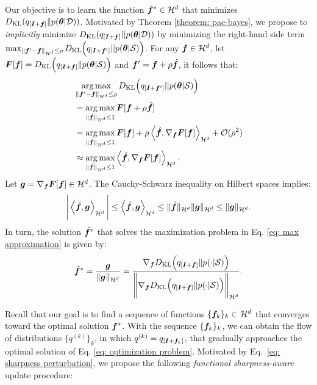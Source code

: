   Our objective is to learn the function ${\bm{f}}^* \in {\mathcal{H}}^d$ that minimizes $D_{\mathrm{KL}}(q_{[{\bm{I}} + {\bm{f}}]}\| p({\bm{\theta}}| {\mathcal{D}}))$. Motivated by Theorem \ref{theorem: pac-bayes}, we propose to \textit{implicitly} minimize $D_{\mathrm{KL}}(q_{[{\bm{I}} + {\bm{f}}]} || p({\bm{\theta}}|{\mathcal{D}}))$ by minimizing the right-hand side term $\max_{\|{\bm{f}}'-{\bm{f}}\|_{{\mathcal{H}}^d} \leq \rho}D_{\mathrm{KL}}\Big(q_{[{\bm{I}} + {\bm{f}}']} || p({\bm{\theta}} | {\mathcal{S}})\Big)$. For any ${\bm{f}} \in {\mathcal{H}}^d$, let ${\bm{F}}[{\bm{f}}] = D_{\mathrm{KL}}\Big(q_{[{\bm{I}} + {\bm{f}}]} \|p({\bm{\theta}} | {\mathcal{S}})\Big)$ and ${\bm{f}}' = {\bm{f}} + \rho \hat{{\bm{f}}}$, it follows that:
\begin{align}
    &\operatorname*{arg\,max}_{\|{\bm{f}}'-{\bm{f}}\|_{{\mathcal{H}}^d} \leq \rho}D_{\mathrm{KL}}\Big(q_{[{\bm{I}} + {\bm{f}}']} || p({\bm{\theta}} | {\mathcal{S}})\Big) \\
    &= \operatorname*{arg\,max}_{\|\hat{{\bm{f}}}\|_{{\mathcal{H}}^d} \leq 1}{\bm{F}}[{\bm{f}}+\rho \hat{{\bm{f}}}] \\
    &= \operatorname*{arg\,max}_{\|\hat{{\bm{f}}}\|_{{\mathcal{H}}^d} \leq 1}{\bm{F}}[{\bm{f}}]+\rho\left<\hat{{\bm{f}}}, \nabla_{\bm{f}} {\bm{F}}[{\bm{f}}]\right>_{{\mathcal{H}}^d} + {\mathcal{O}}(\rho^2)\\
    &\approx\operatorname*{arg\,max}_{\|\hat{{\bm{f}}}\|_{{\mathcal{H}}^d} \leq 1}\left<\hat{{\bm{f}}}, \nabla_{\bm{f}} {\bm{F}}[{\bm{f}}]\right>_{{\mathcal{H}}^d}.
    \label{eq: max approximation}
\end{align}
Let ${\bm{g}} = \nabla_{\bm{f}} {\bm{F}}[{\bm{f}}] \in {\mathcal{H}}^d$. The Cauchy-Schwarz inequality on Hilbert spaces \citep{functional_analysis} implies:
\begin{equation*}
    \Bigg| \left<\hat{{\bm{f}}}, {\bm{g}}\right>_{{\mathcal{H}}^d}\Bigg| \leq \left<\hat{{\bm{f}}}, {\bm{g}}\right>_{{\mathcal{H}}^d} \leq \|\hat{{\bm{f}}}\|_{{\mathcal{H}}^d} \|{\bm{g}}\|_{{\mathcal{H}}^d} \leq \|{\bm{g}}\|_{{\mathcal{H}}^d}. 
\end{equation*}
In turn, the solution $\hat{{\bm{f}}}^*$ that solves the maximization problem in Eq. \ref{eq: max approximation} is given by:
\begin{equation}
    \label{eq: sharpness perturbation}
    \hat{{\bm{f}}}^* = \frac{{\bm{g}}}{\|{\bm{g}}\|_{{\mathcal{H}}^d}} = \frac{\nabla_{\bm{f}} D_{\mathrm{KL}} \Big(q_{[{\bm{I}} + {\bm{f}}]} \| p(\cdot | {\mathcal{S}})\Big)}{\Bigg\|\nabla_{\bm{f}} D_{\mathrm{KL}} \Big(q_{[{\bm{I}} + {\bm{f}}]}\| p(\cdot | {\mathcal{S}})\Big)\Bigg\|_{{\mathcal{H}}^d}}.
\end{equation}

Recall that our goal is to find a sequence of functions $\{{\bm{f}}_k\}_k \subset {\mathcal{H}}^d$ that converges toward the optimal solution ${\bm{f}}^*$. With the sequence $\{{\bm{f}}_k\}_k$, we can obtain the flow of distributions $\{q^{(k)}\}_k$, in which $q^{(k)} = q_{[{\bm{I}} + {\bm{f}}_k]}$, that gradually approaches the optimal solution of Eq. \ref{eq: optimization problem}. Motivated by Eq.~\ref{eq: sharpness perturbation}, we propose the following \textit{functional sharpness-aware} update procedure:

